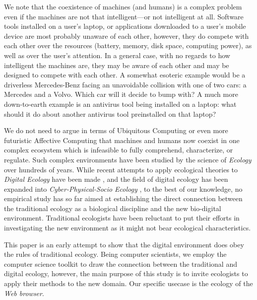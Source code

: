\documentclass[ijoc,nonblindrev]{informs3} %
\numberwithin{equation}{subsection}
\begin{document}
We note that the coexistence of machines (and humans) is a complex problem even if the machines are not that intelligent---or not intelligent at all. Software tools installed on a user's laptop, or applications downloaded to a user's mobile device are most probably unaware of each other, however, they do compete with each other over the resources (battery, memory, disk space, computing power), as well as over the user's attention. In a general case, with no regards to how intelligent the machines are, they may be aware of each other and may be designed to compete with each other. A somewhat esoteric example would be a driverless Mercedes-Benz facing an unavoidable collision with one of two cars: a Mercedes and a Volvo. Which car will it decide to bump with? A much more down-to-earth example is an antivirus tool being installed on a laptop: what should it do about another antivirus tool preinstalled on that laptop? 

We do not need to argue in terms of Ubiquitous Computing \citep{abowd2000charting} or even more futuristic Affective Computing \citep{picard1997affective} that machines and humans now coexist in one complex ecosystem which is infeasible to fully comprehend, characterize, or regulate. Such complex environments have been studied by the science of \emph{Ecology} over hundreds of years. While recent attempts to apply ecological theories to \emph{Digital Ecology} have been made \citep{kleineberg2015digital}, and the field of digital ecology has been expanded into \emph{Cyber-Physical-Socio Ecology} \citep{shi2011cyber}, to the best of our knowledge, no empirical study has so far aimed at establishing the direct connection between the traditional ecology as a biological discipline and the new bio-digital environment. Traditional ecologists have been reluctant to put their efforts in investigating the new environment as it might not bear ecological characteristics. 

This paper is an early attempt to show that the digital environment does obey the rules of traditional ecology. Being computer scientists, we employ the computer science toolkit to draw the connection between the traditional and digital ecology, however, the main purpose of this study is to invite ecologists to apply their methods to the new domain. Our specific usecase is the ecology of the \emph{Web browser}.
\end{document}
